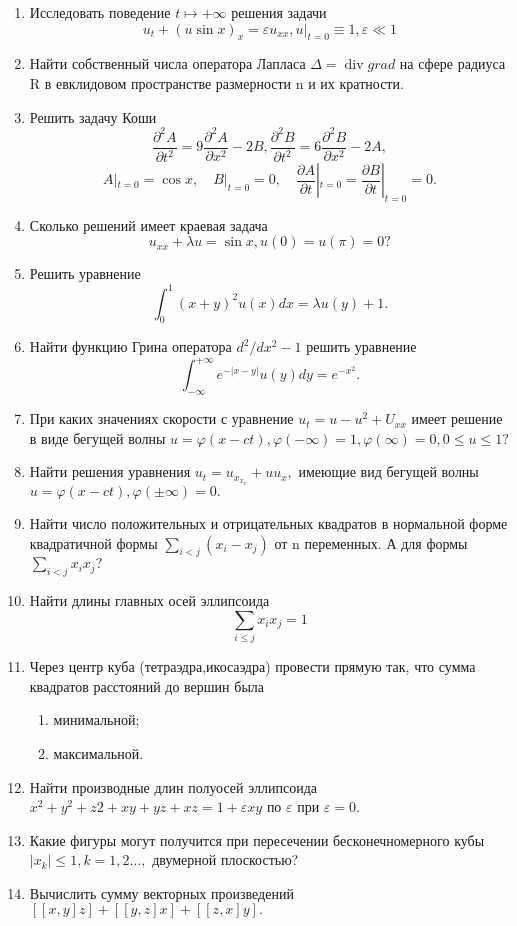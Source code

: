 \documentclass{article}
\begin{document}
\begin{enumerate}
\item Исследовать поведение $t\mapsto+\infty$ решения задачи $$u_{t}+(u\sin x)_{x}=\varepsilon u_{x{x}}, u|_{t=0}\equiv1,\varepsilon\ll1$$
\item Найти собственный числа оператора Лапласа $\Delta=\operatorname{div}grad$ на сфере радиуса R в евклидовом пространстве размерности n и их кратности.
\item Решить задачу Коши $$\frac{\partial^{2}A}{\partial t^{2}}=9\frac{\partial^{2}A}{\partial x^{2}}-2B, \frac{\partial^{2}B}{\partial t^{2}}=6\frac{\partial^{2}B}{\partial x^{2}}-2A,$$
$$ A|_{t=0}=\cos x,\quad B|_{t=0}=0, \quad\frac{\partial A}{\partial t}|_{t=0}=\frac{\partial B}{\partial t}|_{t=0}=0.$$
\item Сколько решений имеет краевая задача $$u_{x{x}}+\lambda u=\sin x, u(0)=u(\pi)=0?$$
\item Решить уравнение $$ \int_0^1(x+y)^{2}u(x)dx=\lambda u(y)+1.$$
\item Найти функцию Грина оператора $d^{2}/dx^{2}-1$ решить уравнение $$\int_{-\infty}^{+\infty}e^{-|x-y|}u(y)dy=e^{-x^{2}}. $$
\item При каких значениях скорости с уравнение $u_{t}=u-u^{2}+U_{x{x}}$ имеет решение в виде бегущей волны $u=\varphi(x-ct),\varphi(-\infty)=1,\varphi(\infty)=0,0\leq u\leq1?$
\item Найти решения уравнения $u_{t}=u_{x_{x_{x}}}+uu_{x},$ имеющие вид бегущей волны $u=\varphi(x-ct),\varphi(\pm\infty)=0.$
\item Найти число положительных и отрицательных квадратов в нормальной форме квадратичной формы $\sum_{i<j}(x_{i}-x_{j})$ от n переменных. А для формы $\sum_{i<j}x_{i}x_{j}?$
\item Найти длины главных осей эллипсоида $$\sum_{i\leq j}x_{i}x_{j}=1$$
\item Через центр куба (тетраэдра,икосаэдра) провести прямую так, что сумма квадратов расстояний до вершин была
\begin{enumerate}
\item минимальной;
\item максимальной.
 \end{enumerate}
\item Найти производные длин полуосей эллипсоида $x^{2}+y^{2}+z{2}+xy+yz+xz=1+\varepsilon xy$ по $\varepsilon$ при $\varepsilon=0$.
\item Какие фигуры могут получится при пересечении бесконечномерного кубы $|x_{k}|\leq1, k=1,2...,$ двумерной плоскостью?
\item Вычислить сумму векторных произведений $[[x,y]z]+[[y,z]x]+[[z,x]y].$

\end{enumerate}
\end{document}
